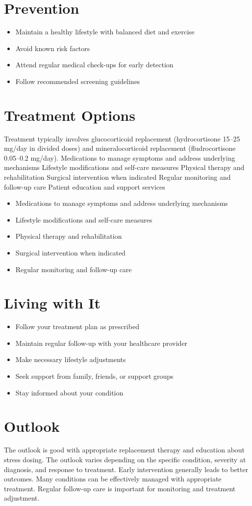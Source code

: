 \section{Prevention}
\begin{itemize}[noitemsep]
  \item Maintain a healthy lifestyle with balanced diet and exercise
  \item Avoid known risk factors
  \item Attend regular medical check-ups for early detection
  \item Follow recommended screening guidelines
\end{itemize}
\section{Treatment Options}
Treatment typically involves glucocorticoid replacement (hydrocortisone 15--25 mg/day in divided doses) and mineralocorticoid replacement (fludrocortisone 0.05--0.2 mg/day). Medications to manage symptoms and address underlying mechanisms Lifestyle modifications and self-care measures Physical therapy and rehabilitation Surgical intervention when indicated Regular monitoring and follow-up care Patient education and support services

\begin{itemize}[noitemsep]
  \item Medications to manage symptoms and address underlying mechanisms
  \item Lifestyle modifications and self-care measures
  \item Physical therapy and rehabilitation
  \item Surgical intervention when indicated
  \item Regular monitoring and follow-up care
\end{itemize}
\section{Living with It}
\begin{itemize}[noitemsep]
  \item Follow your treatment plan as prescribed
  \item Maintain regular follow-up with your healthcare provider
  \item Make necessary lifestyle adjustments
  \item Seek support from family, friends, or support groups
  \item Stay informed about your condition
\end{itemize}
\section{Outlook}
The outlook is good with appropriate replacement therapy and education about stress dosing. The outlook varies depending on the specific condition, severity at diagnosis, and response to treatment. Early intervention generally leads to better outcomes. Many conditions can be effectively managed with appropriate treatment. Regular follow-up care is important for monitoring and treatment adjustment.
